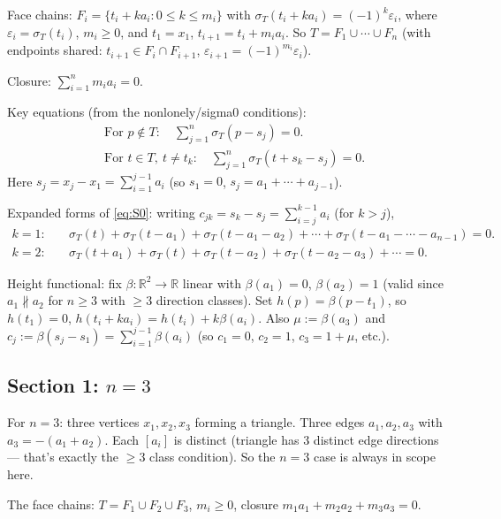 Face chains: $F_i = \{t_i + k a_i : 0 \leq k \leq m_i\}$ with $\sigma_T(t_i + k a_i) = (-1)^k \varepsilon_i$, where $\varepsilon_i = \sigma_T(t_i)$, $m_i \geq 0$, and $t_1 = x_1$, $t_{i+1} = t_i + m_i a_i$. So $T = F_1 \cup \cdots \cup F_n$ (with endpoints shared: $t_{i+1} \in F_i \cap F_{i+1}$, $\varepsilon_{i+1} = (-1)^{m_i}\varepsilon_i$).

Closure: $\sum_{i=1}^n m_i a_i = 0$.

Key equations (from the nonlonely/sigma0 conditions):
\begin{align}
  &\text{For } p \notin T: \quad \textstyle\sum_{j=1}^n \sigma_T(p - s_j) = 0. \tag{NL}\label{eq:NL}\\
  &\text{For } t \in T,\ t \neq t_k: \quad \textstyle\sum_{j=1}^n \sigma_T(t + s_k - s_j) = 0. \tag{S0}\label{eq:S0}
\end{align}
Here $s_j = x_j - x_1 = \sum_{i=1}^{j-1} a_i$ (so $s_1=0$, $s_j = a_1 + \cdots + a_{j-1}$).

Expanded forms of \eqref{eq:S0}: writing $c_{jk} = s_k - s_j = \sum_{i=j}^{k-1}a_i$ (for $k>j$),
\begin{align*}
  k=1:&\quad \sigma_T(t) + \sigma_T(t-a_1) + \sigma_T(t-a_1-a_2) + \cdots + \sigma_T(t-a_1-\cdots-a_{n-1}) = 0.\\
  k=2:&\quad \sigma_T(t+a_1) + \sigma_T(t) + \sigma_T(t-a_2) + \sigma_T(t-a_2-a_3) + \cdots = 0.
\end{align*}

Height functional: fix $\beta : \mathbb{R}^2 \to \mathbb{R}$ linear with $\beta(a_1) = 0$, $\beta(a_2) = 1$ (valid since $a_1 \not\parallel a_2$ for $n \geq 3$ with $\geq 3$ direction classes). Set $h(p) = \beta(p - t_1)$, so $h(t_1)=0$, $h(t_i + k a_i) = h(t_i) + k\beta(a_i)$. Also $\mu := \beta(a_3)$ and $c_j := \beta(s_j - s_1) = \sum_{i=1}^{j-1}\beta(a_i)$ (so $c_1=0$, $c_2=1$, $c_3=1+\mu$, etc.).

\bigskip

\subsection*{Section 1: $n=3$}

For $n=3$: three vertices $x_1,x_2,x_3$ forming a triangle. Three edges $a_1,a_2,a_3$ with $a_3 = -(a_1+a_2)$. Each $[a_i]$ is distinct (triangle has 3 distinct edge directions — that's exactly the $\geq 3$ class condition). So the $n=3$ case is always in scope here.

The face chains: $T = F_1 \cup F_2 \cup F_3$, $m_i \geq 0$, closure $m_1 a_1 + m_2 a_2 + m_3 a_3 = 0$.

